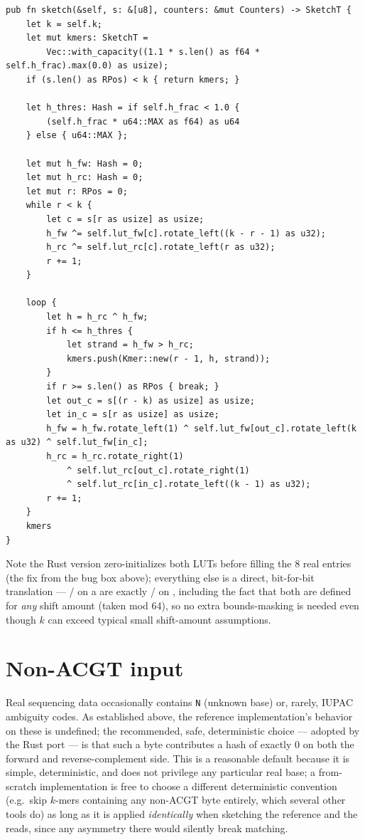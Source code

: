 \begin{lstlisting}[style=rststyle,caption={\code{FracMinHash::sketch}, Rust port (\texttt{src/sketch.rs})}]
pub fn sketch(&self, s: &[u8], counters: &mut Counters) -> SketchT {
    let k = self.k;
    let mut kmers: SketchT =
        Vec::with_capacity((1.1 * s.len() as f64 * self.h_frac).max(0.0) as usize);
    if (s.len() as RPos) < k { return kmers; }

    let h_thres: Hash = if self.h_frac < 1.0 {
        (self.h_frac * u64::MAX as f64) as u64
    } else { u64::MAX };

    let mut h_fw: Hash = 0;
    let mut h_rc: Hash = 0;
    let mut r: RPos = 0;
    while r < k {
        let c = s[r as usize] as usize;
        h_fw ^= self.lut_fw[c].rotate_left((k - r - 1) as u32);
        h_rc ^= self.lut_rc[c].rotate_left(r as u32);
        r += 1;
    }

    loop {
        let h = h_rc ^ h_fw;
        if h <= h_thres {
            let strand = h_fw > h_rc;
            kmers.push(Kmer::new(r - 1, h, strand));
        }
        if r >= s.len() as RPos { break; }
        let out_c = s[(r - k) as usize] as usize;
        let in_c = s[r as usize] as usize;
        h_fw = h_fw.rotate_left(1) ^ self.lut_fw[out_c].rotate_left(k as u32) ^ self.lut_fw[in_c];
        h_rc = h_rc.rotate_right(1)
            ^ self.lut_rc[out_c].rotate_right(1)
            ^ self.lut_rc[in_c].rotate_left((k - 1) as u32);
        r += 1;
    }
    kmers
}
\end{lstlisting}

Note the Rust version zero-initializes both LUTs before filling the 8 real entries (the fix from
the bug box above); everything else is a direct, bit-for-bit translation --- /
 on a  are exactly / on
, including the fact that both are defined for \emph{any} shift amount (taken mod
64), so no extra bounds-masking is needed even though $k$ can exceed typical small shift-amount
assumptions.

\section{Non-ACGT input}
\label{sec:sketch-nonacgt}

Real sequencing data occasionally contains \texttt{N} (unknown base) or, rarely, IUPAC ambiguity
codes. As established above, the reference implementation's behavior on these is undefined; the
recommended, safe, deterministic choice --- adopted by the Rust port --- is that such a byte
contributes a hash of exactly $0$ on both the forward and reverse-complement side. This is a
reasonable default because it is simple, deterministic, and does not privilege any particular
real base; a from-scratch implementation is free to choose a different deterministic convention
(e.g.\ skip $k$-mers containing any non-ACGT byte entirely, which several other tools do) as long
as it is applied \emph{identically} when sketching the reference and the reads, since any
asymmetry there would silently break matching.

